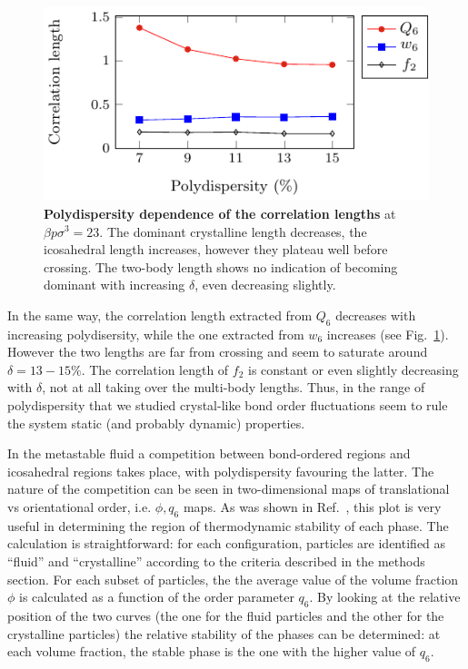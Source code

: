 \documentclass[twocolumn,superscriptaddress]{revtex4-1}
\begin{document}
\begin{figure}
 \centering
 \includegraphics{fig_lengthpoly}
	\caption{\textbf{Polydispersity dependence of the correlation lengths} at $\beta p\sigma^3=23$. The dominant crystalline length decreases, the icosahedral length increases, however they plateau well before crossing. The two-body length shows no indication of becoming dominant with increasing $\delta$, even decreasing slightly.}
	\label{fig:lengthpoly}
\end{figure}

In the same way, the correlation length extracted from $Q_6$ decreases with increasing polydisersity, while the one extracted from $w_6$ increases (see Fig.~\ref{fig:lengthpoly}). However the two lengths are far from crossing and seem to saturate around $\delta=13-15\%$. The correlation length of $f_2$ is constant or even slightly decreasing with $\delta$, not at all taking over the multi-body lengths. Thus, in the range of polydispersity that we studied crystal-like bond order fluctuations seem to rule the system static (and probably dynamic) properties.


In the metastable fluid a competition between bond-ordered regions and icosahedral regions takes
place, with polydispersity favouring the latter. The nature of the competition can be seen
in two-dimensional maps of translational vs orientational order, i.e. $\phi,q_6$ maps.
As was shown in Ref.~\cite{russo_hs}, this plot is very useful in determining the region
of thermodynamic stability of each phase. The calculation is straightforward: for each
configuration, particles are identified as ``fluid'' and ``crystalline'' according to
the criteria described in the methods section. For each subset of particles, the
the average value of the volume fraction
$\phi$ is calculated as a function of the order parameter $q_6$. By looking at the
relative position of the two curves (the one for the fluid particles and the other for the crystalline particles)
the relative stability of the phases can be determined: at each volume fraction,
the stable phase is the one with the higher value of $q_6$. 
\end{document}
